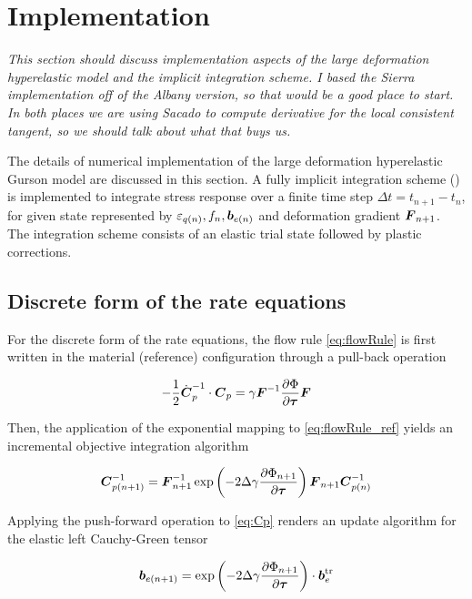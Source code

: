 \chapter{Implementation}
\label{implementation}

\textit{This section should discuss implementation aspects of the
  large deformation hyperelastic model and the implicit integration
  scheme. I based the Sierra implementation off of the Albany version,
  so that would be a good place to start. In both places we are using
  Sacado to compute derivative for the local consistent tangent, so we
  should talk about what that buys us.}

The details of numerical implementation of the large deformation hyperelastic Gurson model are discussed in this section. A fully implicit integration scheme (\cite{SimoHughes:98, Steinmann1994}) is implemented to integrate stress response over a finite time step $\Delta t = t_{n+1} - t_n$, for given state represented by $\varepsilon_{q(n)}, f_n, {\boldsymbol{b}}_{e(n)}$ and deformation gradient ${\boldsymbol{F}}_{n+1}$. The integration scheme consists of an elastic trial state followed by plastic corrections.

\section{Discrete form of the rate equations}

For the discrete form of the rate equations, the flow rule \eqref{eq:flowRule} is first written in the material (reference) configuration through a pull-back operation

\begin{equation}\label{eq:flowRule_ref}
-\frac{1}{2}\dot{{\boldsymbol{C}}}_p^{-1}\cdot{\boldsymbol{C}}_p = \gamma{\boldsymbol{F}}^{-1}\frac{\partial\Phi}{\partial{\boldsymbol{\tau}}}{\boldsymbol{F}}
\end{equation}

Then, the application of the exponential mapping to \eqref{eq:flowRule_ref} yields an incremental objective integration algorithm

\begin{equation}\label{eq:Cp}
{\boldsymbol{C}}_{p(n+1)}^{-1} = {\boldsymbol{F}}_{n+1}^{-1}\exp\left( -2\Delta\gamma \frac{\partial\Phi_{n+1}}{\partial{\boldsymbol{\tau}}}\right){\boldsymbol{F}}_{n+1}{\boldsymbol{C}}_{p(n)}^{-1}
\end{equation}

Applying the push-forward operation to \eqref{eq:Cp} renders an update algorithm for the elastic left Cauchy-Green tensor

\begin{equation}\label{eq:be_n}
{\boldsymbol{b}}_{e(n+1)} = \exp\left( -2\Delta\gamma\frac{\partial\Phi_{n+1}}{\partial{\boldsymbol{\tau}}}\right)\cdot{\boldsymbol{b}}_e^{\operatorname{\text{tr}}}
\end{equation}

